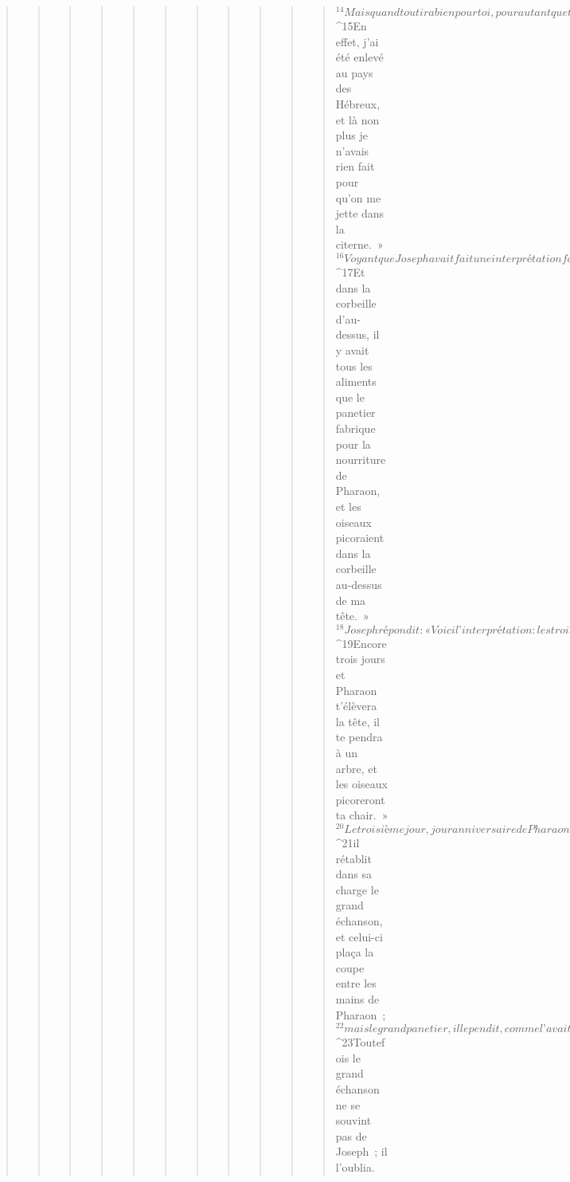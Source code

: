 \begin{verse}
\begin{verse}
\begin{verse}
\begin{verse}
\begin{verse}
\begin{verse}
\begin{verse}
\begin{verse}
\begin{verse}
\begin{verse}
\begin{verse}
${}^{14}Mais quand tout ira bien pour toi, pour autant que tu te souviennes d’avoir été avec moi, montre ta faveur à mon égard : rappelle-moi au souvenir de Pharaon et fais-moi sortir de cette maison ! 
${}^{15}En effet, j’ai été enlevé au pays des Hébreux, et là non plus je n’avais rien fait pour qu’on me jette dans la citerne. »
${}^{16}Voyant que Joseph avait fait une interprétation favorable, le grand panetier lui dit : « Moi, j’ai rêvé que je portais sur la tête trois corbeilles de gâteaux. 
${}^{17}Et dans la corbeille d’au-dessus, il y avait tous les aliments que le panetier fabrique pour la nourriture de Pharaon, et les oiseaux picoraient dans la corbeille au-dessus de ma tête. » 
${}^{18}Joseph répondit : « Voici l’interprétation : les trois corbeilles représentent trois jours. 
${}^{19}Encore trois jours et Pharaon t’élèvera la tête, il te pendra à un arbre, et les oiseaux picoreront ta chair. » 
${}^{20}Le troisième jour, jour anniversaire de Pharaon, celui-ci fit un festin pour tous ses serviteurs. Il éleva la tête du grand échanson et celle du grand panetier en présence de ses serviteurs : 
${}^{21}il rétablit dans sa charge le grand échanson, et celui-ci plaça la coupe entre les mains de Pharaon ; 
${}^{22}mais le grand panetier, il le pendit, comme l’avait annoncé Joseph. 
${}^{23}Toutefois le grand échanson ne se souvint pas de Joseph ; il l’oublia.
      

\end{verse}
\end{verse}
\end{verse}
\end{verse}
\end{verse}
\end{verse}
\end{verse}
\end{verse}
\end{verse}
\end{verse}
\end{verse}

